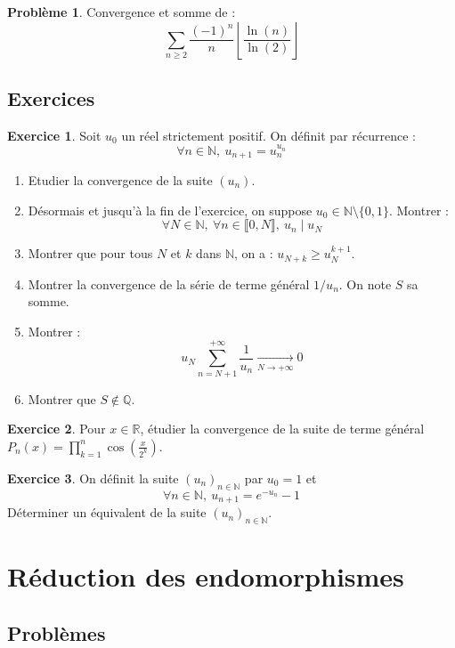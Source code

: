 \documentclass[french]{book}
\newcommand{\N}{\mathbb{N}}
\newcommand{\Q}{\mathbb{Q}}
\newcommand{\R}{\mathbb{R}}
\theoremstyle{definition}
\newtheorem{ex}{Exercice}[chapter]
\newtheorem{pro}{Problème}[chapter]
\begin{document}
\begin{pro}
	Convergence et somme de : $$\sum_{n\geqslant 2}\frac{(-1)^n}{n}\left\lfloor\frac{\ln(n)}{\ln(2)}\right\rfloor$$
\end{pro}

\section{Exercices}

\begin{ex}
	Soit $u_0$ un réel strictement positif. On définit par récurrence : $$\forall n\in\N,\ u_{n+1}=u_n^{u_n}$$
	\begin{enumerate}
		\item Etudier la convergence de la suite $(u_n)$.
		\item Désormais et jusqu'à la fin de l'exercice, on suppose $u_0\in\N\setminus\{0,1\}$. Montrer : $$\forall N\in\N,\ \forall n\in\llbracket0,N\rrbracket,\ u_n\mid u_N$$
		\item Montrer que pour tous $N$ et $k$ dans $\N$, on a : $u_{N+k}\geqslant u_N^{k+1}$.
		\item Montrer la convergence de la série de terme général $1/u_n$. On note $S$ sa somme.
		\item Montrer : $$u_N\sum_{n=N+1}^{+\infty}\frac{1}{u_n}\xrightarrow[N\to+\infty]{}0$$
		\item Montrer que $S\notin\Q$.
	\end{enumerate}
\end{ex}

\begin{ex}
	Pour $x\in\R$, étudier la convergence de la suite de terme général $P_n(x)=\displaystyle\prod_{k=1}^{n}\cos\left(\frac{x}{2^k}\right)$.
\end{ex}

\begin{ex}
	On définit la suite $(u_n)_{n\in\N}$ par $u_0=1$ et $$\forall n\in\N,\ u_{n+1}=e^{-u_n}-1$$ Déterminer un équivalent de la suite $(u_n)_{n\in\N}$.
\end{ex}

\chapter{Réduction des endomorphismes}

\section{Problèmes}
\end{document}
